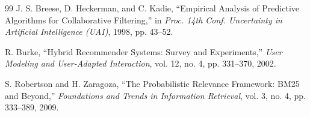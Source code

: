 \documentclass[12pt,a4paper]{report}
\begin{document}
\begin{thebibliography}{99}
 J. S. Breese, D. Heckerman, and C. Kadie, ``Empirical Analysis of Predictive Algorithms for Collaborative Filtering,'' in \textit{Proc. 14th Conf. Uncertainty in Artificial Intelligence (UAI)}, 1998, pp. 43--52.

 R. Burke, ``Hybrid Recommender Systems: Survey and Experiments,'' \textit{User Modeling and User-Adapted Interaction}, vol. 12, no. 4, pp. 331--370, 2002.

 S. Robertson and H. Zaragoza, ``The Probabilistic Relevance Framework: BM25 and Beyond,'' \textit{Foundations and Trends in Information Retrieval}, vol. 3, no. 4, pp. 333--389, 2009.
\end{thebibliography}
\end{document}
